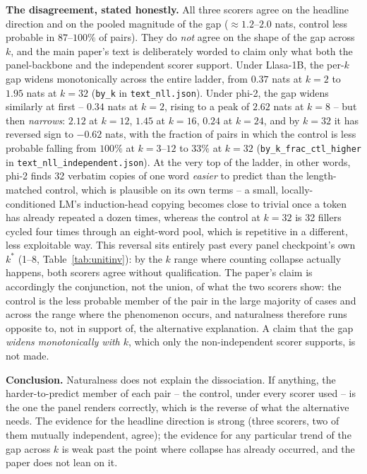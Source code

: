 \documentclass[11pt]{article}
\begin{document}
\textbf{The disagreement, stated honestly.} All three scorers agree on the
headline direction and on the pooled magnitude of the gap ($\approx 1.2$--$2.0$
nats, control less probable in $87$--$100\%$ of pairs). They do \emph{not}
agree on the shape of the gap across $k$, and the main paper's text is
deliberately worded to claim only what both the panel-backbone and the
independent scorer support. Under Llasa-1B, the per-$k$ gap widens
monotonically across the entire ladder, from $0.37$ nats at $k{=}2$ to $1.95$
nats at $k{=}32$ (\texttt{by\_k} in \texttt{text\_nll.json}). Under phi-2, the
gap widens similarly at first -- $0.34$ nats at $k{=}2$, rising to a peak of
$2.62$ nats at $k{=}8$ -- but then \emph{narrows}: $2.12$ at $k{=}12$, $1.45$
at $k{=}16$, $0.24$ at $k{=}24$, and by $k{=}32$ it has reversed sign to
$-0.62$ nats, with the fraction of pairs in which the control is less probable
falling from $100\%$ at $k{=}3$--$12$ to $33\%$ at $k{=}32$
(\texttt{by\_k\_frac\_ctl\_higher} in \texttt{text\_nll\_independent.json}).
At the very top of the ladder, in other words, phi-2 finds 32 verbatim copies
of one word \emph{easier} to predict than the length-matched control, which is
plausible on its own terms -- a small, locally-conditioned LM's induction-head
copying becomes close to trivial once a token has already repeated a dozen
times, whereas the control at $k{=}32$ is 32 fillers cycled four times through
an eight-word pool, which is repetitive in a different, less exploitable way.
This reversal sits entirely past every panel checkpoint's own $k^\ast$
(1--8, Table~\ref{tab:unitinv}): by the $k$ range where
counting collapse actually happens, both scorers agree without qualification.
The paper's claim is accordingly the conjunction, not the union, of what the
two scorers show: the control is the less probable member of the pair in the
large majority of cases and across the range where the phenomenon occurs, and
naturalness therefore runs opposite to, not in support of, the alternative
explanation. A claim that the gap \emph{widens monotonically with $k$}, which
only the non-independent scorer supports, is not made.

\textbf{Conclusion.} Naturalness does not explain the dissociation. If
anything, the harder-to-predict member of each pair -- the control, under
every scorer used -- is the one the panel renders correctly, which is the
reverse of what the alternative needs. The evidence for the headline
direction is strong (three scorers, two of them mutually independent, agree);
the evidence for any particular trend of the gap across $k$ is weak past the
point where collapse has already occurred, and the paper does not lean on it.
\end{document}
